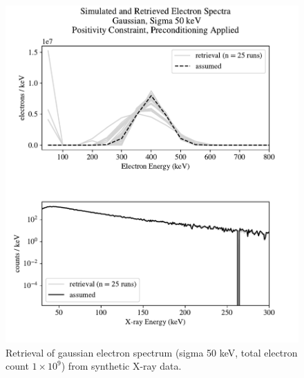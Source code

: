 \begin{figure}[p]
    \centering
    \includegraphics[width=\textwidth]{figures/chapter_4/synthetic_data_examples/gauss_50keV_posonly_preconditioning_1e9_particles}
    \caption{Retrieval of gaussian electron spectrum (sigma 50 keV, total electron count $1\times10^9$) from synthetic X-ray data.}
    \label{why_non_negative_is_good}
\end{figure}

